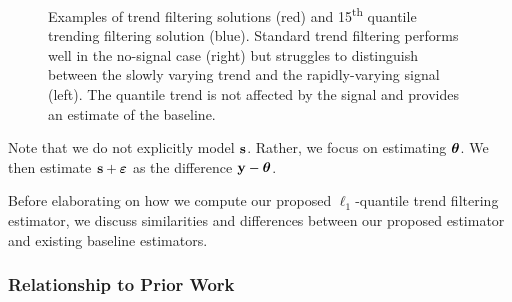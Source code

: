 \documentclass[aoas]{imsart}
\newcommand{\V}[1]{{\bm{\mathbf{\MakeLowercase{#1}}}}} %
\begin{document}
\begin{figure}
	\centering
	\caption{Examples of trend filtering solutions (red) and 15\textsuperscript{th} quantile trending filtering solution (blue). Standard trend filtering performs well in the no-signal case (right) but struggles to distinguish between the slowly varying trend and the rapidly-varying signal (left). The quantile trend is not affected by the signal and provides an estimate of the baseline.}
\end{figure}
Note that we do not explicitly model $\V{s}$. Rather, we focus on estimating $\V{\theta}$. We then estimate $\V{s} + \V{\varepsilon}$ as the difference $\V{y} - \V{\theta}$.

Before elaborating on how we compute our proposed $\ell_1$-quantile trend filtering estimator, we discuss similarities and differences between our proposed estimator and existing baseline estimators.

\subsubsection{Relationship to Prior Work}
\end{document}

